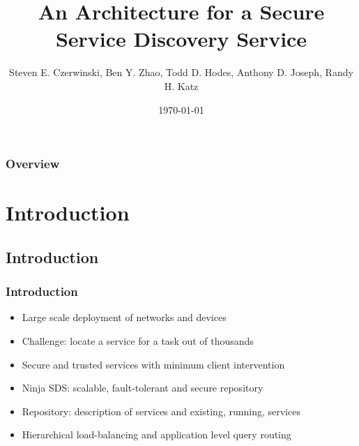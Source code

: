 \documentclass{beamer}
\title[SSDS]{An Architecture for a Secure Service Discovery Service} %
\author{Steven E. Czerwinski, Ben Y. Zhao, Todd D. Hodes, Anthony D. Joseph, Randy H. Katz} %
\institute[UC Berkeley] %
{
University of California, Berkeley \\ %
\medskip
\textit{\{czerwin, ravenben, hodes, adj, randy\}@cs.berkeley.edu} %
}
\date{\today} %
\begin{document}
\begin{frame}
\titlepage %
\end{frame}

\begin{frame}
\frametitle{Overview} %
\tableofcontents %
\end{frame}


\section{Introduction} %

\subsection{Introduction} %

\begin{frame}
\frametitle{Introduction}
\begin{itemize} 
\item Large scale deployment of networks and devices
\item Challenge: locate a service for a task out of thousands
\item Secure and trusted services with minimum client intervention
\item Ninja SDS: scalable, fault-tolerant and secure repository
\item Repository: description of services and existing, running, services
\item Hierarchical load-balancing and application level query routing
\end{itemize}
\end{frame}
\end{document}
